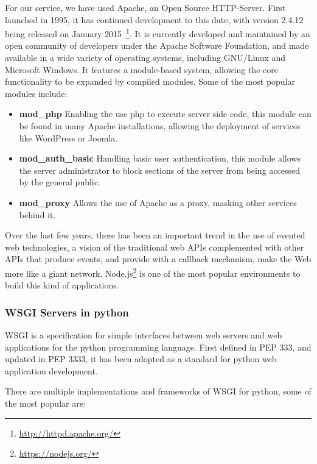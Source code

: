 For our service, we have used Apache\cite{apacheabout}, an Open Source HTTP-Server. First launched in 1995, it has continued development to this date, with version 2.4.12 being released on January 2015~\footnote{\url{http://httpd.apache.org/}}. It is currently developed and maintained by an open community of developers under the Apache Software Foundation, and made available in a wide variety of operating systems, including GNU/Linux and Microsoft Windows\textregistered. It features a module-based system, allowing the core functionality to be expanded by compiled modules. Some of the most popular modules include:

\begin{itemize}%
 \item \textbf{mod\_php} Enabling the use php to execute server side code, this module can be found in many Apache installations, allowing the deployment of services like WordPress or Joomla.
 \item \textbf{mod\_auth\_basic} Handling basic user authentication, this module allows the server administrator to block sections of the server from being accessed by the general public.
 \item \textbf{mod\_proxy} Allows the use of Apache as a proxy, masking other services behind it.
\end{itemize}

Over the last few years, there has been an important trend in the use of evented web technologies, a vision of the traditional web APIs complemented with other APIs that produce events, and provide with a callback mechanism, make the Web more like a giant network. Node.js\footnote{\url{https://nodejs.org/}} is one of the most popular environments to build this kind of applications.

\subsubsection{WSGI Servers in python}

\ac{WSGI} is a specification for simple interfaces between web servers and web applications for the python programming language. First defined in PEP 333\cite{pep0333}, and updated in PEP 3333\cite{pep3333}, it has been adopted as a standard for python web application development.

There are multiple implementations and frameworks of WSGI for python, some of the most popular are:


